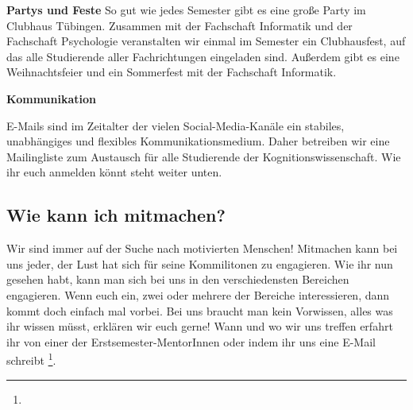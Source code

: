\pagebreak

\textbf{Partys und Feste}
So gut wie jedes Semester gibt es eine große Party im Clubhaus Tübingen. Zusammen mit der Fachschaft Informatik und der Fachschaft Psychologie veranstalten wir einmal im Semester ein Clubhausfest, auf das alle Studierende aller Fachrichtungen eingeladen sind. Außerdem gibt es eine Weihnachtsfeier und ein Sommerfest mit der Fachschaft Informatik.

\textbf{Kommunikation}

E-Mails sind im Zeitalter der vielen Social-Media-Kanäle ein stabiles, unabhängiges und flexibles Kommunikationsmedium. Daher betreiben wir eine Mailingliste zum Austausch für alle Studierende der Kognitionswissenschaft. Wie ihr euch anmelden könnt steht weiter unten. \\

\subsection{Wie kann ich mitmachen?}
Wir sind immer auf der Suche nach motivierten Menschen! Mitmachen kann bei uns jeder, der Lust hat sich für seine Kommilitonen zu engagieren. Wie ihr nun gesehen habt, kann man sich bei uns in den verschiedensten Bereichen engagieren. Wenn euch ein, zwei oder mehrere der Bereiche interessieren, dann kommt doch einfach mal vorbei. Bei uns braucht man kein Vorwissen, alles was ihr wissen müsst, erklären wir euch gerne!
Wann und wo wir uns treffen erfahrt ihr von einer der Erstsemester-MentorInnen oder indem ihr uns eine E-Mail schreibt \footnote{}.


